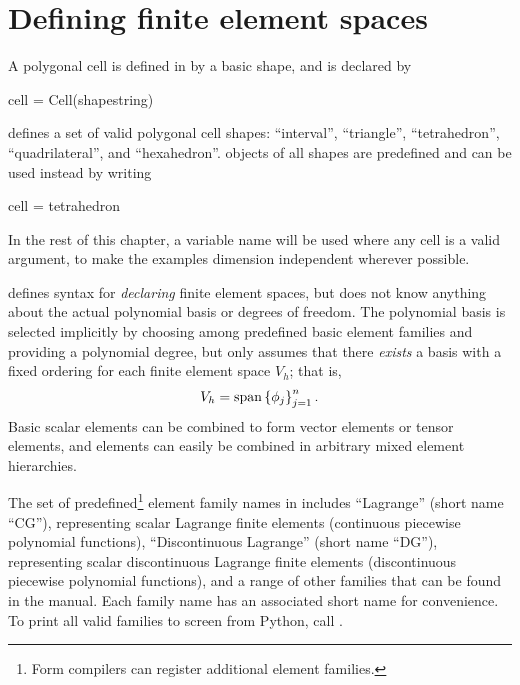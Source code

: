 \section{Defining finite element spaces} \label{ufl:sec:elements}
A polygonal cell is defined in \ufl{} by a basic shape, and is declared by
\begin{uflcode}
cell = Cell(shapestring)
\end{uflcode}
\ufl{} defines a set of valid polygonal cell shapes: ``interval'',
``triangle'', ``tetrahedron'', ``quadrilateral'', and ``hexahedron''.
 objects of all shapes are predefined and can be used
instead by writing
\begin{uflcode}
cell = tetrahedron
\end{uflcode}
In the rest of this chapter, a variable name  will be used
where any cell is a valid argument, to make the examples dimension
independent wherever possible.

\ufl{} defines syntax for \emph{declaring} finite element spaces, but
does not know anything about the actual polynomial basis or degrees of
freedom. The polynomial basis is selected implicitly by choosing among
predefined basic element families and providing a polynomial degree,
but \ufl{} only assumes that there \emph{exists} a basis with a fixed
ordering for each finite element space $V_h$; that is,
\begin{align}
V_h = \operatorname{span}\left\{ \phi_j \right\}_{j=1}^{n}.
\end{align}
Basic scalar elements can be combined to form vector elements or
tensor elements, and elements can easily be combined in arbitrary
mixed element hierarchies.

The set of predefined\footnote{Form compilers can register additional
  element families.}  element family names in \ufl{} includes
``Lagrange'' (short name ``CG''), representing scalar Lagrange finite
elements (continuous piecewise polynomial functions), ``Discontinuous
Lagrange'' (short name ``DG''), representing scalar discontinuous
Lagrange finite elements (discontinuous piecewise polynomial
functions), and a range of other families that can be found in the
manual.  Each family name has an associated short name for
convenience.  To print all valid families to screen from Python, call
.


